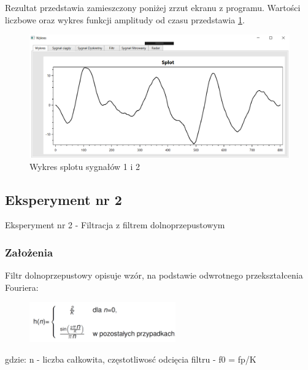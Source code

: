 \documentclass[12pt]{article}
\begin{document}
Rezultat przedstawia zamieszczony poniżej zrzut ekranu z programu. Wartości liczbowe oraz wykres funkcji amplitudy od czasu przedstawia \ref{Wykres dla wynikw eksperymentu pierwszego}.
\begin{figure}[h!]
 \centering
 \includegraphics[width=12.3cm]{splot.PNG}
 \vspace{-0.3cm}
 \caption{Wykres splotu sygnałów 1 i 2}
 \label{Wykres dla wynikw eksperymentu pierwszego}
\end{figure}



\subsection{Eksperyment nr 2}
Eksperyment nr 2  - Filtracja z filtrem dolnoprzepustowym

\subsubsection{Założenia}
Filtr dolnoprzepustowy opisuje wzór, na podstawie odwrotnego przekształcenia Fouriera:

\begin{figure}[h!]
 \centering
 \includegraphics[width=6.3cm]{four.PNG}
 \vspace{-0.3cm}
 \label{gw}
\end{figure}

gdzie:
\subitem n - liczba całkowita,
\subitem częstotliwosć odcięcia filtru - f0 =  fp/K
\end{document}
